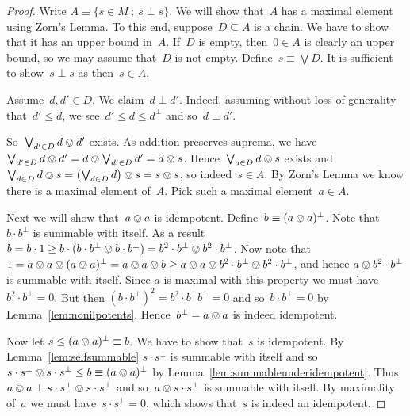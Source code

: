 \documentclass[10pt,conference]{IEEEtran}
\theoremstyle{definition}
\begin{document}
\begin{proof}
    Write $A \equiv \{s\in M\ ;\ s\perp s \}$.
    We will show that~$A$ has a maximal element using Zorn's Lemma.
    To this end, suppose~$D \subseteq A$ is a chain.
    We have to show that it has an upper bound in~$A$.
    If~$D$ is empty, then~$0 \in A$ is clearly an upper bound,
        so we may assume that~$D$ is not empty.
    Define~$s \equiv \bigvee D$.
    It is sufficient to show~$s \perp s$ as then~$s \in A$.

    Assume~$d, d' \in D$.
    We claim~$d \perp d'$.
    Indeed, assuming without loss of generality
    that~$d' \leq d$, we see~$d' \leq d \leq d^\perp$ 
        and so~$d \perp d'$.

    So~$\bigvee_{d' \in D} d \ovee d'$ exists.
As addition preserves suprema, we
    have~$\bigvee_{d' \in D} d \ovee d'
            = d \ovee \bigvee_{d' \in D} {d'} = d \ovee s$.
    Hence~$\bigvee_{d \in D} d \ovee s$ exists
        and~$\bigvee_{d\in D} d \ovee s
        = \bigl(\bigvee_{d \in D} d\bigr) \ovee s
        = s \ovee s$, so indeed~$s \in A$.
    By Zorn's Lemma we know there is a maximal element of~$A$.
    Pick such a maximal element~$a \in A$.

    Next we will show that~$a\ovee a$ is idempotent.
    Define~$b\equiv (a\ovee a)^\perp$.
    Note that $b\cdot b^\perp$ is summable with
    itself. As a result $b = b \cdot 1
    \geq b \cdot(b\cdot b^\perp \ovee  b\cdot b^\perp) =
    b^2 \cdot b^\perp \ovee  b^2 \cdot b^\perp$.
    Now note that $1=a\ovee a \ovee
    (a\ovee a)^\perp = a\ovee a \ovee  b \geq a\ovee a \ovee
    b^2 \cdot b^\perp \ovee  b^2 \cdot b^\perp$,
    and hence $a\ovee b^2 \cdot b^\perp$ is
    summable with itself. Since $a$ is maximal with this property
    we must have $b^2 \cdot b^\perp = 0$. But then $(b\cdot b^\perp)^2 = b^2\cdot b^\perp
    b^\perp = 0$ and so~$b\cdot b^\perp = 0$
    by Lemma~\ref{lem:nonilpotents}.
    Hence~$b^\perp = a\ovee a$ is indeed idempotent.

    Now let $s\leq (a \ovee a)^\perp\equiv  b$.
    We have to show that~$s$ is idempotent. By
    Lemma~\ref{lem:selfsummable} $s\cdot s^\perp$ is summable with itself
    and so~ $
    s\cdot s^\perp\ovee s\cdot s^\perp \leq  b 
        \equiv (a \ovee a)^\perp $ by
    Lemma~\ref{lem:summableunderidempotent}.
    Thus~$a \ovee a  \perp s\cdot s^\perp \ovee s\cdot s^\perp$
        and so~$a \ovee s \cdot s^\perp$ is summable with itself.
        By maximality of~$a$ we must have~$s \cdot s^\perp = 0$,
            which shows that~$s$ is indeed an idempotent.
\end{proof}
\end{document}
